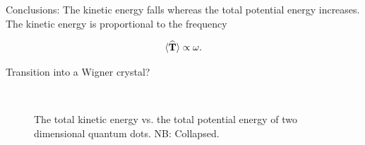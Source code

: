 \begin{frame}
 Conclusions:
 \shift
 The kinetic energy falls whereas the total potential energy increases.
 \shift
 The kinetic energy is proportional to the frequency
 
 \begin{equation}
  \langle {\bf\widehat{T}} \rangle \propto \omega.
 \end{equation}
 
\end{frame}

\begin{frame}
 Transition into a Wigner crystal? 
 \captionsetup[subfloat]{labelformat=empty}
 \begin{figure}[h]
 \begin{center}
   \\
  \caption{The total kinetic energy vs. the total potential energy of two dimensional quantum dots. NB: Collapsed.}
  \label{fig:V_dist_qdots}
 \end{center}
\end{figure}
\captionsetup[subfloat]{labelformat=parens}
\end{frame}

